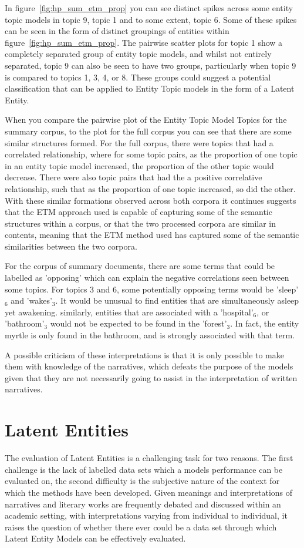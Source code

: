 \documentclass[10pt]{report}
\begin{document}
In figure~\ref{fig:hp_sum_etm_prop} you can see distinct spikes across some entity topic models in topic 9, topic 1 and to some extent, topic 6. Some of these spikes can be seen in the form of distinct groupings of entities within figure~\ref{fig:hp_sum_etm_prop}. The pairwise scatter plots for topic 1 show a completely separated group of entity topic models, and whilst not entirely separated, topic 9 can also be seen to have two groups, particularly when topic 9 is compared to topics 1, 3, 4, or 8. These groups could suggest a potential classification that can be applied to Entity Topic models in the form of a Latent Entity.

When you compare the pairwise plot of the Entity Topic Model Topics for the summary corpus, to the plot for the full corpus you can see that there are some similar structures formed. For the full corpus, there were topics that had a correlated relationship, where for some topic pairs, as the proportion of one topic in an entity topic model increased, the proportion of the other topic would decrease. There were also topic pairs that had the a positive correlative relationship, such that as the proportion of one topic increased, so did the other. With these similar formations observed across both corpora it continues suggests that the ETM approach used is capable of capturing some of the semantic structures within a corpus, or that the two processed corpora are similar in contents, meaning that the ETM method used has captured some of the semantic similarities between the two corpora.

For the corpus of summary documents, there are some terms that could be labelled as 'opposing' which can explain the negative correlations seen between some topics. For topics 3 and 6, some potentially opposing terms would be 'sleep'$_6$ and 'wakes'$_3$. It would be unusual to find entities that are simultaneously asleep yet awakening. similarly, entities that are associated with a 'hospital'$_6$, or 'bathroom'$_3$ would not be expected to be found in the 'forest'$_3$. In fact, the entity myrtle is only found in the bathroom, and is strongly associated with that term.

A possible criticism of these interpretations is that it is only possible to make them with knowledge of the narratives, which defeats the purpose of the models given that they are not necessarily going to assist in the interpretation of written narratives.

\section{Latent Entities}
The evaluation of Latent Entities is a challenging task for two reasons. The first challenge is the lack of labelled data sets which a models performance can be evaluated on, the second difficulty is the subjective nature of the context for which the methods have been developed. Given meanings and interpretations of  narratives and literary works are frequently debated and discussed within an academic setting, with interpretations varying from individual to individual, it raises the question of whether there ever could be a data set through which Latent Entity Models can be effectively evaluated.
\end{document}
